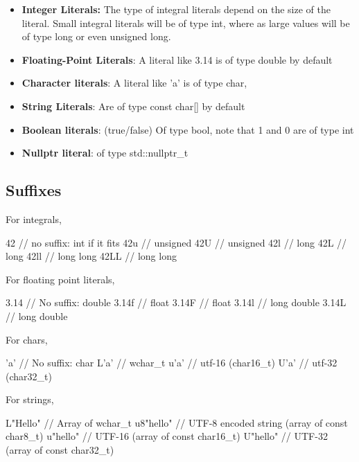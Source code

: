 \documentclass{report}
\begin{document}
\pagebreak 
{}
\bigbreak \noindent 
\begin{itemize}
    \item \textbf{Integer Literals:} The type of integral literals depend on the size of the literal. Small integral literals will be of type int, where as large values will be of type long or even unsigned long.
    \item \textbf{Floating-Point Literals}: A literal like 3.14 is of type double by default
    \item \textbf{Character literals}: A literal like 'a' is of type char, 
    \item \textbf{String Literals}: Are of type const char[] by default
    \item \textbf{Boolean literals}: (true/false) Of type bool, note that 1 and 0 are of type int
    \item \textbf{Nullptr literal}: of type std::nullptr\_t
\end{itemize}
\subsection{Suffixes}
\bigbreak \noindent 
For integrals,
\begin{cppcode}
42 // no suffix: int if it fits
42u // unsigned
42U // unsigned
42l // long
42L // long
42ll // long long
42LL // long long
\end{cppcode}
\bigbreak \noindent 
For floating point literals,
\bigbreak \noindent 
\begin{cppcode}
3.14 // No suffix: double
3.14f // float
3.14F // float
3.14l // long double
3.14L // long double
\end{cppcode}
\bigbreak \noindent 
For chars,
\bigbreak \noindent 
\begin{cppcode}
'a' // No suffix: char
L'a' // wchar_t
u'a' // utf-16 (char16_t)
U'a' // utf-32 (char32_t)
\end{cppcode}
\bigbreak \noindent 
For strings,
\bigbreak \noindent 
\begin{cppcode}
L"Hello" // Array of wchar_t
u8"hello" // UTF-8 encoded string (array of const char8_t)
u"hello" // UTF-16 (array of const char16_t)
U"hello" // UTF-32 (array of const char32_t)
\end{cppcode}
\end{document}
